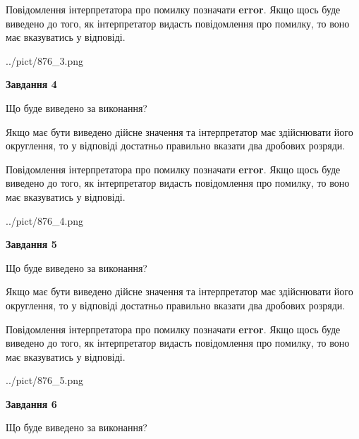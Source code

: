 \documentclass[12pt, ukrainian]{article}
\begin{document}
{\begin {Large}
Повідомлення інтерпретатора про помилку позначати \textbf{error}.
Якщо щось буде виведено до того, як інтерпретатор видасть повідомлення про помилку, 
то воно має вказуватись у відповіді. \par

\begin{center}
	{../pict/876_3.png}
\end{center}
\newpage

{\begin {center}\textbf{Завдання 4}\end {center}}\par
Що буде виведено за виконання? \par

Якщо має бути виведено дійсне значення та інтерпретатор має здійснювати його округлення, 
то у відповіді достатньо правильно вказати два дробових розряди.

Повідомлення інтерпретатора про помилку позначати \textbf{error}.
Якщо щось буде виведено до того, як інтерпретатор видасть повідомлення про помилку, 
то воно має вказуватись у відповіді. \par

\begin{center}
	{../pict/876_4.png}
\end{center}
\newpage

{\begin {center}\textbf{Завдання 5}\end {center}}\par
Що буде виведено за виконання? \par

Якщо має бути виведено дійсне значення та інтерпретатор має здійснювати його округлення, 
то у відповіді достатньо правильно вказати два дробових розряди.

Повідомлення інтерпретатора про помилку позначати \textbf{error}.
Якщо щось буде виведено до того, як інтерпретатор видасть повідомлення про помилку, 
то воно має вказуватись у відповіді. \par

\begin{center}
	{../pict/876_5.png}
\end{center}
\newpage

{\begin {center}\textbf{Завдання 6}\end {center}}\par
Що буде виведено за виконання? \par


\end{Large}}
\end{document}
